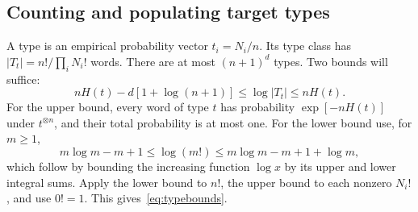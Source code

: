 \subsection{Counting and populating target types}
A type is an empirical probability vector $t_i=N_i/n$. Its type class has $|T_t|=n!/\prod_iN_i!$ words. There are at most $(n+1)^d$ types. Two bounds will suffice:
\begin{equation}
 nH(t)-d[1+\log(n+1)]\le\log|T_t|\le nH(t). \label{eq:typebounds}
\end{equation}
For the upper bound, every word of type $t$ has probability $\exp[-nH(t)]$ under $t^{\otimes n}$, and their total probability is at most one. For the lower bound use, for $m\ge1$,
\[
 m\log m-m+1\le\log(m!)\le m\log m-m+1+\log m,
\]
which follow by bounding the increasing function $\log x$ by its upper and lower integral sums. Apply the lower bound to $n!$, the upper bound to each nonzero $N_i!$, and use $0!=1$. This gives~\eqref{eq:typebounds}.

